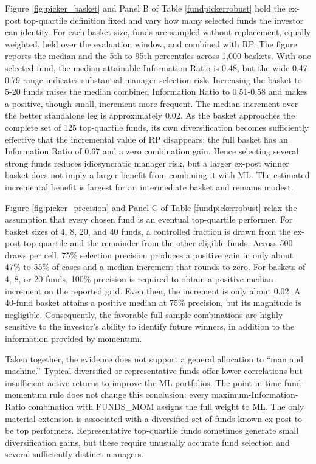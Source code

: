 \documentclass[preprint,12pt,authoryear]{elsarticle}
\begin{document}
Figure \ref{fig:picker_basket} and Panel B of Table \ref{fundpickerrobust} hold the ex-post top-quartile definition fixed and vary how many selected funds the investor can identify. For each basket size, funds are sampled without replacement, equally weighted, held over the evaluation window, and combined with RP. The figure reports the median and the 5th to 95th percentiles across 1,000 baskets. With one selected fund, the median attainable Information Ratio is 0.48, but the wide 0.47-0.79 range indicates substantial manager-selection risk. Increasing the basket to 5-20 funds raises the median combined Information Ratio to 0.51-0.58 and makes a positive, though small, increment more frequent. The median increment over the better standalone leg is approximately 0.02. As the basket approaches the complete set of 125 top-quartile funds, its own diversification becomes sufficiently effective that the incremental value of RP disappears: the full basket has an Information Ratio of 0.67 and a zero combination gain. Hence selecting several strong funds reduces idiosyncratic manager risk, but a larger ex-post winner basket does not imply a larger benefit from combining it with ML. The estimated incremental benefit is largest for an intermediate basket and remains modest.

Figure \ref{fig:picker_precision} and Panel C of Table \ref{fundpickerrobust} relax the assumption that every chosen fund is an eventual top-quartile performer. For basket sizes of 4, 8, 20, and 40 funds, a controlled fraction is drawn from the ex-post top quartile and the remainder from the other eligible funds. Across 500 draws per cell, 75\% selection precision produces a positive gain in only about 47\% to 55\% of cases and a median increment that rounds to zero. For baskets of 4, 8, or 20 funds, 100\% precision is required to obtain a positive median increment on the reported grid. Even then, the increment is only about 0.02. A 40-fund basket attains a positive median at 75\% precision, but its magnitude is negligible. Consequently, the favorable full-sample combinations are highly sensitive to the investor's ability to identify future winners, in addition to the information provided by momentum.

Taken together, the evidence does not support a general allocation to ``man and machine.'' Typical diversified or representative funds offer lower correlations but insufficient active returns to improve the ML portfolios. The point-in-time fund-momentum rule does not change this conclusion: every maximum-Information-Ratio combination with FUNDS\_MOM assigns the full weight to ML. The only material extension is associated with a diversified set of funds known ex post to be top performers. Representative top-quartile funds sometimes generate small diversification gains, but these require unusually accurate fund selection and several sufficiently distinct managers.
\end{document}
